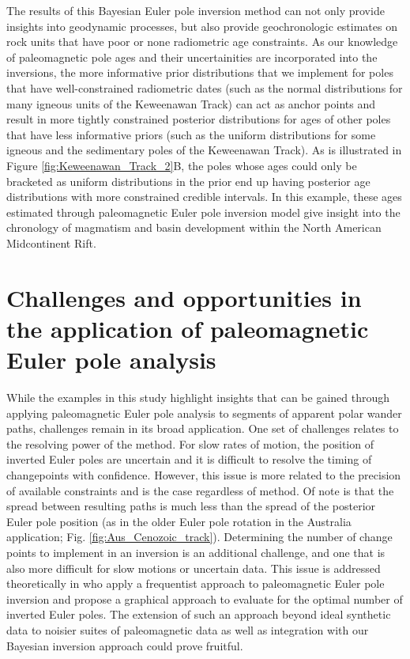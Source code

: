 \documentclass[11pt,letterpaper]{article}
\begin{document}
The results of this Bayesian Euler pole inversion method can not only provide insights into geodynamic processes, but also provide geochronologic estimates on rock units that have poor or none radiometric age constraints. As our knowledge of paleomagnetic pole ages and their uncertainities are incorporated into the inversions, the more informative prior distributions that we implement for poles that have well-constrained radiometric dates (such as the normal distributions for many igneous units of the Keweenawan Track) can act as anchor points and result in more tightly constrained posterior distributions for ages of other poles that have less informative priors (such as the uniform distributions for some igneous and the sedimentary poles of the Keweenawan Track). As is illustrated in Figure \ref{fig:Keweenawan_Track_2}B, the poles whose ages could only be bracketed as uniform distributions in the prior end up having posterior age distributions with more constrained credible intervals. In this example, these ages estimated through paleomagnetic Euler pole inversion model give insight into the chronology of magmatism and basin development within the North American Midcontinent Rift. 

\section*{Challenges and opportunities in the application of paleomagnetic Euler pole analysis}
\label{sec:challenges_and_opportunities}

While the examples in this study highlight insights that can be gained through applying paleomagnetic Euler pole analysis to segments of apparent polar wander paths, challenges remain in its broad application. One set of challenges relates to the resolving power of the method. For slow rates of motion, the position of inverted Euler poles are uncertain and it is difficult to resolve the timing of changepoints with confidence. However, this issue is more related to the precision of available constraints and is the case regardless of method. Of note is that the spread between resulting paths is much less than the spread of the posterior Euler pole position (as in the older Euler pole rotation in the Australia application; Fig. \ref{fig:Aus_Cenozoic_track}). Determining the number of change points to implement in an inversion is an additional challenge, and one that is also more difficult for slow motions or uncertain data. This issue is addressed theoretically in \cite{Gallo2022a} who apply a frequentist approach to paleomagnetic Euler pole inversion and propose a graphical approach to evaluate for the optimal number of inverted Euler poles. The extension of such an approach beyond ideal synthetic data to noisier suites of paleomagnetic data as well as integration with our Bayesian inversion approach could prove fruitful. 
\end{document}
